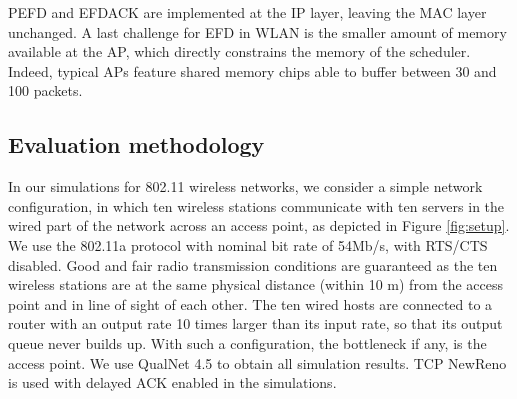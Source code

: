\documentclass[preprint,12pt]{elsarticle}
\begin{document}
PEFD and EFDACK are implemented at the IP layer, leaving the MAC layer unchanged.  A last challenge for EFD in WLAN is the smaller amount of memory available at the AP, which directly constrains the memory of the scheduler. Indeed, typical APs feature shared memory chips able to buffer between 30 and 100 packets.

\subsection{Evaluation methodology} \label{sec:wireless_methodology}


In our simulations for 802.11 wireless networks, we consider a simple network configuration, in which ten wireless stations communicate with ten servers in the wired part of the network across an access point, as depicted in Figure \ref{fig:setup}. We use the 802.11a protocol with nominal bit rate of 54Mb/s, with RTS/CTS disabled. Good and fair radio transmission conditions are guaranteed as the ten wireless stations are at the same physical distance (within 10 m) from the access point and in line of sight of each other. The ten wired hosts are connected to a router with an output rate 10 times larger than its input rate, so that its output queue never builds up. With such a configuration, the bottleneck if any, is the access point. We use QualNet 4.5 to obtain all simulation results.  TCP NewReno is used with delayed ACK enabled in the simulations. 
\end{document}
